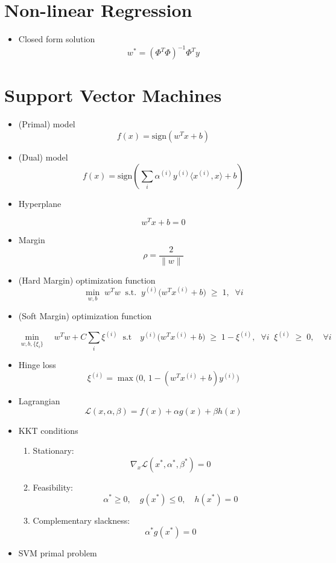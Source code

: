 \documentclass[11pt]{article}
\begin{document}
\section{Non-linear Regression}
\begin{itemize}
	\item Closed form solution
	      \[
		      w^* = (\Phi^T \Phi)^{-1} \Phi^T y
	      \]
\end{itemize}

\section{Support Vector Machines}
\begin{itemize}
	\item (Primal) model
	      \[
		      f(x) = \text{sign}(w^T x + b)
	      \]
	\item (Dual) model
	      \[
		      f(x) = \text{sign}\!\left( \sum_i \alpha^{(i)} y^{(i)} \langle x^{(i)}, x \rangle + b \right)
	      \]
	\item Hyperplane

	      \[
		      w^T x + b = 0
	      \]
	\item Margin
	      \[
		      \rho = \frac{2}{\|w\|}
	      \]
	\item (Hard Margin) optimization function
	      \[
		      \min_{w,b} \; w^Tw \; \; \text{s.t.} \; \; y^{(i)} \big(w^T x^{(i)} + b\big) \;\geq\; 1,
		      \; \; \forall i
	      \]

	\item (Soft Margin) optimization function

	      \[
		      \min_{w,b,\{\xi_i\}} \quad w^T w + C \sum_i \xi^{(i)} \; \; \text{s.t} \quad y^{(i)} \big(w^T x^{(i)} + b\big) \;\geq\; 1 - \xi^{(i)}, \; \; \forall i \;\; \xi^{(i)} \;\geq\; 0, \quad \forall i
	      \]
	\item Hinge loss
	      \[
		      \xi^{(i)} = \max \big(0, \, 1 - (w^T x^{(i)} + b)y^{(i)}\big)
	      \]
	\item Lagrangian
	      \[
		      \mathcal{L}(x, \alpha, \beta) = f(x) + \alpha g(x) + \beta h(x)
	      \]
	\item KKT conditions
	      \begin{enumerate}
		      \item Stationary:
		            \[
			            \nabla_x \mathcal{L}(x^*, \alpha^*, \beta^*) = 0
		            \]
		      \item Feasibility:
		            \[
			            \alpha^* \geq 0, \quad g(x^*) \leq 0, \quad h(x^*) = 0
		            \]
		      \item Complementary slackness:
		            \[
			            \alpha^* g(x^*) = 0
		            \]
	      \end{enumerate}
	\item SVM primal problem


\end{itemize}
\end{document}
